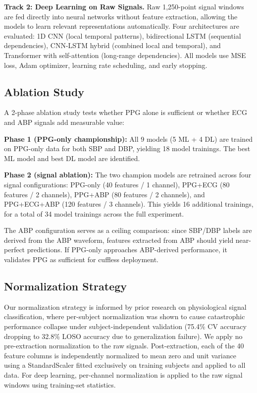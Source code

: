 \documentclass[11pt]{article}
\begin{document}
\textbf{Track 2: Deep Learning on Raw Signals.} Raw 1,250-point signal windows are fed directly into neural networks without feature extraction, allowing the models to learn relevant representations automatically. Four architectures are evaluated: 1D CNN (local temporal patterns), bidirectional LSTM (sequential dependencies), CNN-LSTM hybrid (combined local and temporal), and Transformer with self-attention (long-range dependencies). All models use MSE loss, Adam optimizer, learning rate scheduling, and early stopping.

\subsection{Ablation Study}

A 2-phase ablation study tests whether PPG alone is sufficient or whether ECG and ABP signals add measurable value:

\textbf{Phase 1 (PPG-only championship):} All 9 models (5 ML + 4 DL) are trained on PPG-only data for both SBP and DBP, yielding 18 model trainings. The best ML model and best DL model are identified.

\textbf{Phase 2 (signal ablation):} The two champion models are retrained across four signal configurations: PPG-only (40 features / 1 channel), PPG+ECG (80 features / 2 channels), PPG+ABP (80 features / 2 channels), and PPG+ECG+ABP (120 features / 3 channels). This yields 16 additional trainings, for a total of 34 model trainings across the full experiment.

The ABP configuration serves as a ceiling comparison: since SBP/DBP labels are derived from the ABP waveform, features extracted from ABP should yield near-perfect predictions. If PPG-only approaches ABP-derived performance, it validates PPG as sufficient for cuffless deployment.

\subsection{Normalization Strategy}

Our normalization strategy is informed by prior research on physiological signal classification, where per-subject normalization was shown to cause catastrophic performance collapse under subject-independent validation (75.4\% CV accuracy dropping to 32.8\% LOSO accuracy due to generalization failure). We apply no pre-extraction normalization to the raw signals. Post-extraction, each of the 40 feature columns is independently normalized to mean zero and unit variance using a StandardScaler fitted exclusively on training subjects and applied to all data. For deep learning, per-channel normalization is applied to the raw signal windows using training-set statistics.
\end{document}
